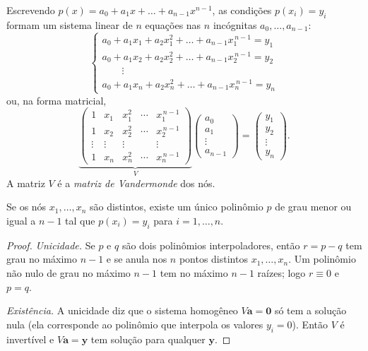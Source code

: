 Escrevendo $p(x)=a_0+a_1x+\dots+a_{n-1}x^{n-1}$, as condições $p(x_i)=y_i$ formam um
sistema linear de $n$ equações nas $n$ incógnitas $a_0,\dots,a_{n-1}$:
\[
\begin{cases}
a_0+a_1x_1+a_2x_1^2+\dots+a_{n-1}x_1^{\,n-1}=y_1\\
a_0+a_1x_2+a_2x_2^2+\dots+a_{n-1}x_2^{\,n-1}=y_2\\
\qquad\vdots\\
a_0+a_1x_n+a_2x_n^2+\dots+a_{n-1}x_n^{\,n-1}=y_n
\end{cases}
\]
ou, na forma matricial,
\[
\underbrace{\begin{pmatrix}
1 & x_1 & x_1^2 & \cdots & x_1^{\,n-1}\\
1 & x_2 & x_2^2 & \cdots & x_2^{\,n-1}\\
\vdots & \vdots & \vdots & & \vdots\\
1 & x_n & x_n^2 & \cdots & x_n^{\,n-1}
\end{pmatrix}}_{V}
\begin{pmatrix}a_0\\ a_1\\ \vdots\\ a_{n-1}\end{pmatrix}
=
\begin{pmatrix}y_1\\ y_2\\ \vdots\\ y_n\end{pmatrix}.
\]
A matriz $V$ é a \emph{matriz de Vandermonde} dos nós.

\begin{teorema}\label{teo:unicidade}
Se os nós $x_1,\dots,x_n$ são distintos, existe um único polinômio $p$ de grau
menor ou igual a $n-1$ tal que $p(x_i)=y_i$ para $i=1,\dots,n$.
\end{teorema}

\begin{proof}
\emph{Unicidade.} Se $p$ e $q$ são dois polinômios interpoladores, então $r=p-q$ tem grau
no máximo $n-1$ e se anula nos $n$ pontos distintos $x_1,\dots,x_n$. Um polinômio não nulo
de grau no máximo $n-1$ tem no máximo $n-1$ raízes; logo $r\equiv 0$ e $p=q$.

\emph{Existência.} A unicidade diz que o sistema homogêneo $V\mathbf a=\mathbf 0$ só tem a
solução nula (ela corresponde ao polinômio que interpola os valores $y_i=0$). Então $V$ é
invertível e $V\mathbf a=\mathbf y$ tem solução para qualquer $\mathbf y$.
\end{proof}

